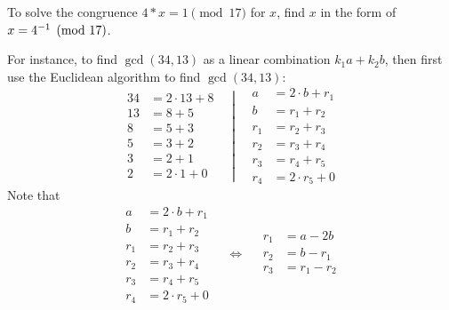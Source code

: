 \begin{remark}
    To solve the congruence $4 \ast x = 1 \pmod{17}$ for $x$, find $x$ in the form of $x = {4}^{-1} \pmod{17}$.
    
    For instance, to find $\gcd(34, 13)$ as a linear combination $k_1 a + k_2 b$, then first use the Euclidean algorithm to find $\gcd(34, 13)$:
    \begin{equation}
        \left.
        \begin{aligned}
            34 &= 2 \cdot 13 + 8 \\
            13 &= 8 + 5 \\
            8  &= 5 + 3 \\
            5  &= 3 + 2 \\
            3  &= 2 + \boxed{1} \\
            2  &= 2 \cdot 1 + 0
        \end{aligned}
        \quad
        \right\vert
        \quad
        \begin{aligned}
            a   &= 2 \cdot b + r_1 \\
            b   &= r_1 + r_2 \\
            r_1 &= r_2 + r_3 \\
            r_2 &= r_3 + r_4 \\
            r_3 &= r_4 + \boxed{r_5} \\
            r_4 &= 2 \cdot r_5 + 0
        \end{aligned}
    \end{equation}
    Note that
    \begin{equation}
            \begin{aligned}
                a   &= 2 \cdot b + r_1 \\
                b   &= r_1 + r_2 \\
                r_1 &= r_2 + r_3 \\
                r_2 &= r_3 + r_4 \\
                r_3 &= r_4 + \boxed{r_5} \\
                r_4 &= 2 \cdot r_5 + 0
            \end{aligned}
            \quad
            \Leftrightarrow
            \quad
            \begin{aligned}
                r_1         &= a - 2b \\
                r_2         &= b - r_1 \\
                r_3         &= r_1 - r_2 \\

\end{aligned}
\end{equation}
\end{remark}
